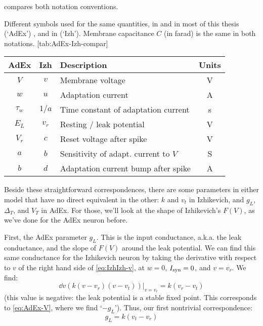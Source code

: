  compares both notation conventions.

\begin{table}[h]
    \begin{sidecaption}
        {Different symbols used for the same quantities, in \cite{Brette2005AdaptiveExponentialIntegrateandFirea} and in most of this thesis (`AdEx') , and in \cite{Izhikevich2007DynamicalSystemsNeuroscience} (`Izh').
        Membrane capacitance $C$ (in farad) is the same in both notations.}
        [tab:AdEx-Izh-compar]
        \begin{tabular}{c c l c}
            AdEx   & Izh  & Description & Units \\
            \hline
            $V$  & $v$   & Membrane voltage & V \\
            $w$  & $u$   & Adaptation current & A \\
            $τ_w$  & $1/a$   & Time constant of adaptation current & s \\
            $E_L$  & $v_r$  & Resting / leak potential & V \\
            $V_r$  & $c$  & Reset voltage after spike & V \\
            $a$  & $b$ & Sensitivity of adapt. current to $V$ & S \\
            $b$  & $d$ & Adaptation current bump after spike & A \\
        \end{tabular}
    \end{sidecaption}
\end{table}

Beside these straightforward correspondences, there are some parameters in either model that have no direct equivalent in the other: $k$ and $v_t$ in Izhikevich, and $g_L$, $Δ_T$, and $V_T$ in AdEx.
For those, we'll look at the shape of Izhikevich's $F(V)$, as we've done for the AdEx neuron before.

First, the AdEx parameter $g_L$. This is the input conductance, a.k.a. the leak conductance, and the slope of $F(V)$ around the leak potential. We can find this same conductance for the Izhikevich neuron by taking the derivative with respect to $v$ of the right hand side of \cref{eq:IzhIzh-v}, at $w = 0$, $I_{\text{syn}} = 0$, and $v = v_r$. We find:
\begin{equation}
    \dd{v}(k(v-v_r)(v-v_t)) \Big|_{v=v_r} = k(v_r - v_t)
\end{equation}
(this value is negative: the leak potential is a stable fixed point. This corresponds to \cref{eq:AdEx-V}, where we find `$-g_L$').
Thus, our first nontrivial correspondence:
\begin{equation}
    g_L = k (v_t - v_r)  \label{eq:leak_conductance}
\end{equation}

